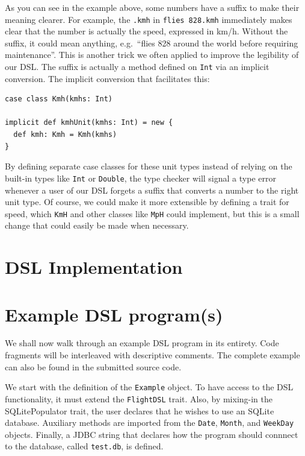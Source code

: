 \documentclass[a4paper]{article}
\newcommand{\cc}[1]{\texttt{#1}}
\renewcommand{\sc}[1]{\lstinline{#1}}
\begin{document}
As you can see in the example above, some numbers have a suffix to make their meaning clearer.
For example, the \sc{.kmh} in \sc{flies 828.kmh} immediately makes clear that the number is actually the speed, expressed in km/h.
Without the suffix, it could mean anything, e.g.\ ``flies 828 around the world before requiring maintenance''.
This is another trick we often applied to improve the legibility of our DSL.
The suffix is actually a method defined on \cc{Int} via an implicit conversion.
The implicit conversion that facilitates this:
\begin{lstlisting}
case class Kmh(kmhs: Int)

implicit def kmhUnit(kmhs: Int) = new {
  def kmh: Kmh = Kmh(kmhs)
}
\end{lstlisting}

By defining separate case classes for these unit types instead of relying on the built-in types like \cc{Int} or \cc{Double}, the type checker will signal a type error whenever a user of our DSL forgets a suffix that converts a number to the right unit type.
Of course, we could make it more extensible by defining a trait for speed, which \cc{KmH} and other classes like \cc{MpH} could implement, but this is a small change that could easily be made when necessary.


\section{DSL Implementation}
\label{sec:dsl-implementation}


\section{Example DSL program(s)}
\label{sec:example-dsl-programs}


We shall now walk through an example DSL program in its entirety.
Code fragments will be interleaved with descriptive comments.
The complete example can also be found in the submitted source code.


We start with the definition of the \cc{Example} object.
To have access to the DSL functionality, it must extend the \cc{FlightDSL} trait.
Also, by mixing-in the SQLitePopulator trait, the user declares that he wishes to use an SQLite database.
Auxiliary methods are imported from the \cc{Date}, \cc{Month}, and \cc{WeekDay} objects.
Finally, a JDBC string that declares how the program should connnect to the database, called \cc{test.db}, is defined.
\end{document}
